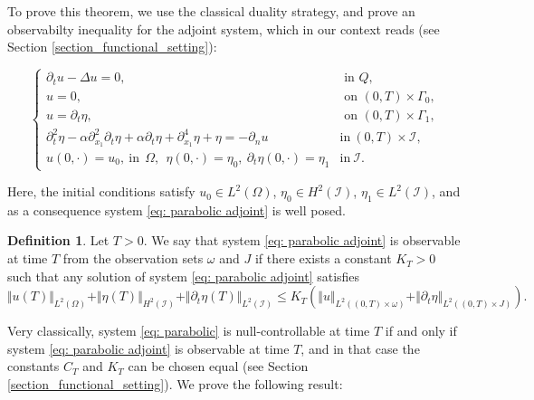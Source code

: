 \documentclass[a4paper, 12pt]{article}
\theoremstyle{plain}
\theoremstyle{definition}
\newtheorem{definition}[theorem]{Definition}
\numberwithin{theorem}{section}
\numberwithin{equation}{section}
\begin{document}
To prove this theorem, we use the classical duality strategy, and prove an observabilty inequality for the adjoint system, which in our context reads (see Section \ref{section_functional_setting}):

\begin{equation} \label{eq: parabolic adjoint}
    \begin{cases}
    \partial_t u - \Delta u = 0, & \text{ in } Q, \\
    u = 0 , & \text{ on } (0,T) \times \Gamma_0, \\
    u = \partial_t \eta,& \text{ on } (0,T) \times \Gamma_1, \\
    \partial^2_{t}\eta-\alpha\partial^2_{x_1}\partial_t\eta+\alpha\partial_t\eta+\partial^4_{x_1}\eta+\eta=-\partial_n u& \text{in}~(0,T) \times\mathcal{I},\\
    u(0,\cdot)=u_0,~\text{in}~~\Omega,~~ \eta(0,\cdot)=\eta_0,~ \partial_t\eta(0,\cdot)=\eta_1 &\text{in}~\mathcal{I}.
    \end{cases}
\end{equation}

Here, the initial conditions satisfy $u_0 \in L^2(\Omega)$, $\eta_0 \in H^2(\mathcal I)$, $\eta_1 \in L^2(\mathcal I)$, and as a consequence system \eqref{eq: parabolic adjoint} is well posed.

\begin{definition}
Let $T>0$. We say that system \eqref{eq: parabolic adjoint} is observable at time $T$ from the observation sets $\omega$ and $J$ if there exists a constant $K_T>0$ such that any solution of system \eqref{eq: parabolic adjoint} satisfies
\begin{equation} \label{eq: observability inequality introduction}
\Vert u(T) \Vert_{L^2(\Omega)} + \Vert \eta(T) \Vert_{H^2(\mathcal I)} + \Vert \partial_t \eta(T) \Vert_{L^2(\mathcal I)} \leq K_T \left( \Vert u \Vert_{L^2((0,T) \times \omega)} + \Vert \partial_t \eta\Vert_{L^2((0,T) \times J)} \right).
\end{equation}
\end{definition}

Very classically, system \eqref{eq: parabolic} is null-controllable at time $T$ if and only if system \eqref{eq: parabolic adjoint} is observable at time $T$, and in that case the constants $C_T$ and $K_T$ can be chosen equal (see Section \ref{section_functional_setting}). We prove the following result:
\end{document}
